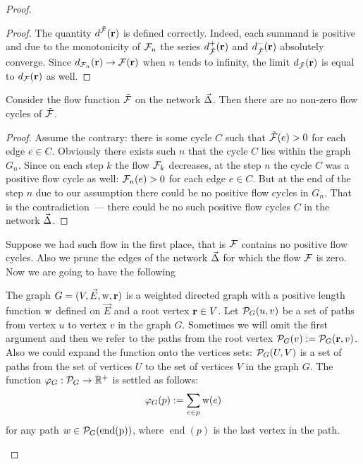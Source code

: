 \documentclass[12pt]{article}
\begin{document}
\begin{proof}
\begin{proof}
        The quantity $d^{\mathcal{\tilde{F}}}(\mathbf{r})$ is defined correctly.
        Indeed, each summand is positive and due to the monotonicity of $\mathcal{F}_{n}$ the series
          $d^{+}_{\mathcal{\tilde{F}}}(\mathbf{r})$ and $d^{-}_{\mathcal{\tilde{F}}}(\mathbf{r})$ absolutely converge.
        Since $d_{\mathcal{F}_{n}}(\mathbf{r}) \to \mathcal{F}(\mathbf{r})$ when $n$ tends to infinity,
          the limit $d_{\mathcal{\tilde{F}}}(\mathbf{r})$ is equal to $d_{\mathcal{F}}(\mathbf{r})$ as well.
      \end{proof}
      \begin{prop}
        Consider the flow function $\mathcal{\tilde{F}}$ on the network $\vec{\Delta}$.
        Then there are no non-zero flow cycles of $\mathcal{\tilde{F}}$.
      \end{prop}
      \begin{proof}
        Assume the contrary: there is some cycle $C$ such that $\mathcal{\tilde{F}}(e) > 0$ for
          each edge $e \in C$.
        Obviously there exists such $n$ that the cycle $C$ lies within the graph $G_n$.
        Since on each step $k$ the flow $\mathcal{F}_{k}$ decreases, at the step $n$
          the cycle $C$ was a positive flow cycle as well: $\mathcal{F}_{n}(e) > 0$ for each edge $e \in C$.
        But at the end of the step $n$ due to our assumption there could be no positive flow cycles in $G_n$.
        That is the contradiction~--- there could be no such positive flow cycles $C$ in the network $\vec{\Delta}$.
      \end{proof}
      Suppose we had such flow in the first place, that is $\mathcal{F}$ contains no positive flow cycles.
      Also we prune the edges of the network $\vec{\Delta}$ for which the flow $\mathcal{F}$ is zero.
      Now we are going to have the following
      \begin{definition}
        The graph $G = (V, \vec{E},\mathrm{w}, \mathbf{r})$ is a weighted directed graph with a positive
          length function $\mathrm{w}$ defined on $\vec{E}$ and a root vertex $\mathbf{r} \in V$.
        Let $\mathcal{P}_{G}(u, v)$ be a set of paths from vertex $u$ to vertex $v$ in the graph $G$.
        Sometimes we will omit the first argument and then we refer to the paths from the root vertex
          $\mathcal{P}_{G}(v) := \mathcal{P}_{G}(\mathbf{r}, v)$.
        Also we could expand the function onto the vertices sets: $\mathcal{P}_{G}(U,V)$ is a set of paths
          from the set of vertices $U$ to the set of vertices $V$ in the graph $G$.
        The function $\varphi_{G}: \mathcal{P}_{G} \to \mathbb{R}^{+}$ is settled as follows:
        \[
          \varphi_{G}(p) := \sum_{e \in p} \mathrm{w}(e)
        \]
        for any path $w \in \mathcal{P}_{G}(\operatorname{\operatorname{end}(p)})$, where $\operatorname{end}(p)$ is the last vertex in the path.

\end{definition}
\end{proof}
\end{document}
